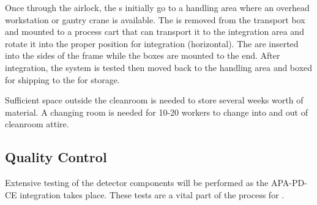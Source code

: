 Once through the airlock,  the s initially go to a handling area where an overhead workstation or gantry crane is available. The  is removed from the transport box and mounted to a process cart that can transport it to the integration area and rotate it into the proper position for integration (horizontal). The  are inserted into the sides of the  frame while the  boxes are mounted to the end. After integration, the system is tested then moved back to the handling area and boxed for shipping to the  for storage.  

Sufficient space outside the cleanroom is needed %
to store several weeks worth of material. %
A changing room is needed for 10-20 workers to change into and out of cleanroom attire.  

\subsection{Quality Control} %
\label{sec:fdsp-tc-itf-qaqc}

Extensive testing of the detector components will be performed %
as the APA-PD-CE integration takes place. These tests are a vital part of the  process for . %


